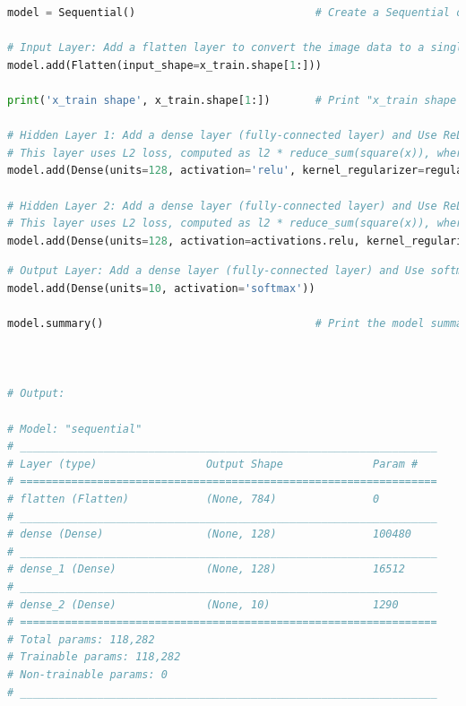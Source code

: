 \documentclass{book}
\begin{document}
\begin{lstlisting}[language=Python, basicstyle=\ttfamily\small, keywordstyle=\color{blue}, commentstyle=\color{forestgreen}, stringstyle=\color{red}, showstringspaces=false]
model = Sequential()                            # Create a Sequential object

# Input Layer: Add a flatten layer to convert the image data to a single column
model.add(Flatten(input_shape=x_train.shape[1:]))

print('x_train shape', x_train.shape[1:])       # Print "x_train shape (28, 28)"

# Hidden Layer 1: Add a dense layer (fully-connected layer) and Use ReLU activation function.
# This layer uses L2 loss, computed as l2 * reduce_sum(square(x)), where l2 is 0.002
model.add(Dense(units=128, activation='relu', kernel_regularizer=regularizers.l2(0.002)))

# Hidden Layer 2: Add a dense layer (fully-connected layer) and Use ReLU activation function.
# This layer uses L2 loss, computed as l2 * reduce_sum(square(x)), where l2 is 0.002
model.add(Dense(units=128, activation=activations.relu, kernel_regularizer=regularizers.l2(0.002)))
\end{lstlisting}
\newpage
\begin{lstlisting}[language=Python, basicstyle=\ttfamily\small, keywordstyle=\color{blue}, commentstyle=\color{forestgreen}, stringstyle=\color{red}, showstringspaces=false]
# Output Layer: Add a dense layer (fully-connected layer) and Use softmax activation function.
model.add(Dense(units=10, activation='softmax'))

model.summary()                                 # Print the model summary



# Output:

# Model: "sequential"
# _________________________________________________________________
# Layer (type)                 Output Shape              Param #
# =================================================================
# flatten (Flatten)            (None, 784)               0
# _________________________________________________________________
# dense (Dense)                (None, 128)               100480
# _________________________________________________________________
# dense_1 (Dense)              (None, 128)               16512
# _________________________________________________________________
# dense_2 (Dense)              (None, 10)                1290
# =================================================================
# Total params: 118,282
# Trainable params: 118,282
# Non-trainable params: 0
# _________________________________________________________________
\end{lstlisting}
\end{document}
